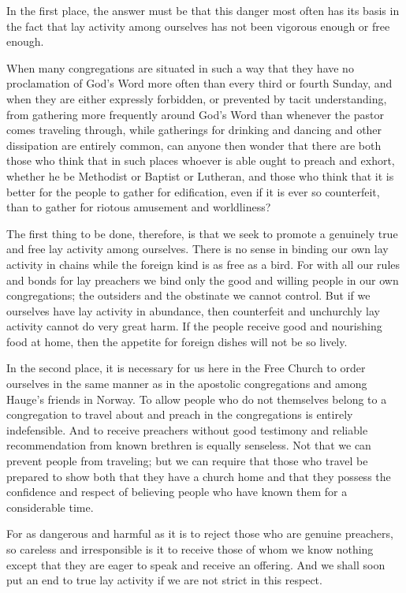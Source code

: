 In the first place, the answer must be that this danger most often has its basis in the fact that lay activity among ourselves has not been vigorous enough or free enough.

When many congregations are situated in such a way that they have no proclamation of God’s Word more often than every third or fourth Sunday, and when they are either expressly forbidden, or prevented by tacit understanding, from gathering more frequently around God’s Word than whenever the pastor comes traveling through, while gatherings for drinking and dancing and other dissipation are entirely common, can anyone then wonder that there are both those who think that in such places whoever is able ought to preach and exhort, whether he be Methodist or Baptist or Lutheran, and those who think that it is better for the people to gather for edification, even if it is ever so counterfeit, than to gather for riotous amusement and worldliness?

The first thing to be done, therefore, is that we seek to promote a genuinely true and free lay activity among ourselves. There is no sense in binding our own lay activity in chains while the foreign kind is as free as a bird. For with all our rules and bonds for lay preachers we bind only the good and willing people in our own congregations; the outsiders and the obstinate we cannot control. But if we ourselves have lay activity in abundance, then counterfeit and unchurchly lay activity cannot do very great harm. If the people receive good and nourishing food at home, then the appetite for foreign dishes will not be so lively.

In the second place, it is necessary for us here in the Free Church to order ourselves in the same manner as in the apostolic congregations and among Hauge’s friends in Norway. To allow people who do not themselves belong to a congregation to travel about and preach in the congregations is entirely indefensible. And to receive preachers without good testimony and reliable recommendation from known brethren is equally senseless. Not that we can prevent people from traveling; but we can require that those who travel be prepared to show both that they have a church home and that they possess the confidence and respect of believing people who have known them for a considerable time.

For as dangerous and harmful as it is to reject those who are genuine preachers, so careless and irresponsible is it to receive those of whom we know nothing except that they are eager to speak and receive an offering. And we shall soon put an end to true lay activity if we are not strict in this respect.

